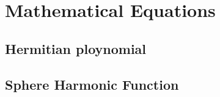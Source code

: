 \chapter{Mathematical Equations}
\section{Hermitian ploynomial}
\label{Hermition_Polynomial}
\section{Sphere Harmonic Function}
\label{SphereHarmonic_Function}